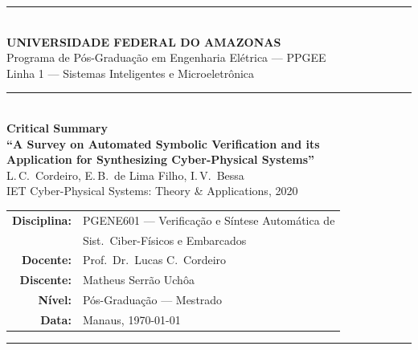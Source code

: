 \documentclass[12pt,a4paper]{article}
\begin{document}

\begin{titlepage}
\centering
\vspace*{0.5cm}

{\color{ufamblue}\rule{\linewidth}{2pt}}\\[0.4cm]
{\Large\bfseries\color{ufamblue} UNIVERSIDADE FEDERAL DO AMAZONAS}\\[0.2cm]
{\large\color{ufamblue} Programa de P\'os-Gradua\c{c}\~ao em Engenharia El\'etrica --- PPGEE}\\[0.1cm]
{\large\color{ufamblue} Linha 1 --- Sistemas Inteligentes e Microeletr\^onica}\\[0.4cm]
{\color{ufamblue}\rule{\linewidth}{2pt}}\\[2.5cm]

{\LARGE\bfseries Critical Summary}\\[0.4cm]
{\Large\bfseries ``A Survey on Automated Symbolic Verification and its}\\[0.1cm]
{\Large\bfseries Application for Synthesizing Cyber-Physical Systems''}\\[0.5cm]
{\large L.\,C.\ Cordeiro, E.\,B.\ de Lima Filho, I.\,V.\ Bessa}\\[0.1cm]
{\normalsize IET Cyber-Physical Systems: Theory \& Applications, 2020}\\[3cm]

\begin{tabular}{rl}
  \textbf{Disciplina:} & PGENE601 --- Verifica\c{c}\~ao e S\'intese Autom\'atica de \\
                        & Sist.\ Ciber-F\'isicos e Embarcados \\[0.3cm]
  \textbf{Docente:}    & Prof.\ Dr.\ Lucas C.\ Cordeiro \\[0.3cm]
  \textbf{Discente:}   & Matheus Serr\~ao Uch\^oa \\[0.3cm]
  \textbf{N\'ivel:}    & P\'os-Gradua\c{c}\~ao --- Mestrado \\[0.3cm]
  \textbf{Data:}       & Manaus, \today \\
\end{tabular}

\vfill
{\color{ufamblue}\rule{\linewidth}{1.5pt}}
\end{titlepage}

\end{document}
